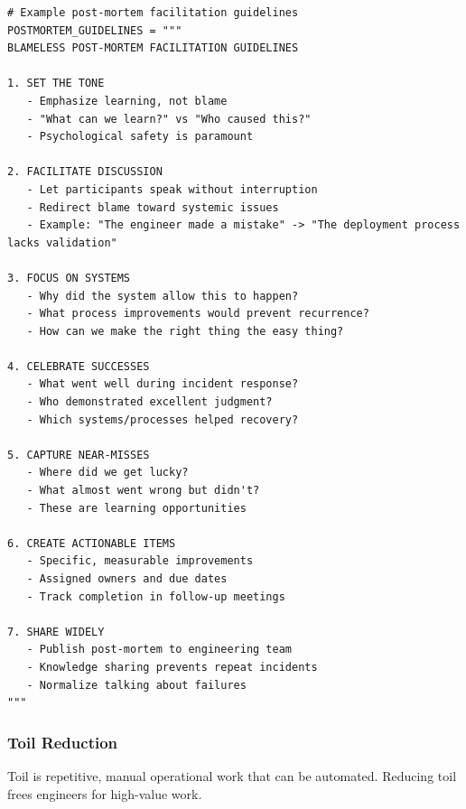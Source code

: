 \begin{lstlisting}[style=python, caption={Blameless post-mortem template}]
# Example post-mortem facilitation guidelines
POSTMORTEM_GUIDELINES = """
BLAMELESS POST-MORTEM FACILITATION GUIDELINES

1. SET THE TONE
   - Emphasize learning, not blame
   - "What can we learn?" vs "Who caused this?"
   - Psychological safety is paramount

2. FACILITATE DISCUSSION
   - Let participants speak without interruption
   - Redirect blame toward systemic issues
   - Example: "The engineer made a mistake" -> "The deployment process lacks validation"

3. FOCUS ON SYSTEMS
   - Why did the system allow this to happen?
   - What process improvements would prevent recurrence?
   - How can we make the right thing the easy thing?

4. CELEBRATE SUCCESSES
   - What went well during incident response?
   - Who demonstrated excellent judgment?
   - Which systems/processes helped recovery?

5. CAPTURE NEAR-MISSES
   - Where did we get lucky?
   - What almost went wrong but didn't?
   - These are learning opportunities

6. CREATE ACTIONABLE ITEMS
   - Specific, measurable improvements
   - Assigned owners and due dates
   - Track completion in follow-up meetings

7. SHARE WIDELY
   - Publish post-mortem to engineering team
   - Knowledge sharing prevents repeat incidents
   - Normalize talking about failures
"""
\end{lstlisting}

\subsubsection{Toil Reduction}

Toil is repetitive, manual operational work that can be automated. Reducing toil frees engineers for high-value work.

